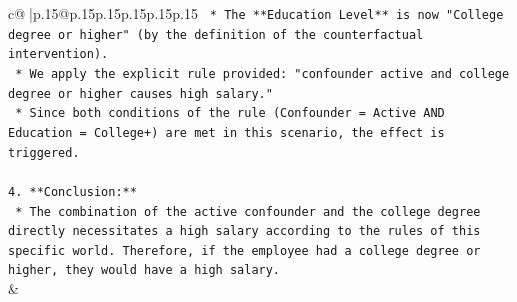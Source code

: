 \documentclass{article}
\begin{document}
{\begin{supertabular}{c@{$\;$}|p{.15\linewidth}@{}p{.15\linewidth}p{.15\linewidth}p{.15\linewidth}p{.15\linewidth}p{.15\linewidth}}
{{{\texttt{        *   The **Education Level** is now "College degree or higher" (by the definition of the counterfactual intervention).} \\
\texttt{    *   We apply the explicit rule provided: "confounder active and college degree or higher causes high salary."} \\
\texttt{    *   Since both conditions of the rule (Confounder = Active AND Education = College+) are met in this scenario, the effect is triggered.} \\
\\ 
\texttt{4.  **Conclusion:**} \\
\texttt{    *   The combination of the active confounder and the college degree directly necessitates a high salary according to the rules of this specific world. Therefore, if the employee had a college degree or higher, they would have a high salary.} \\
            }
        }
    }
    & \\ \\


\end{supertabular}}
\end{document}
